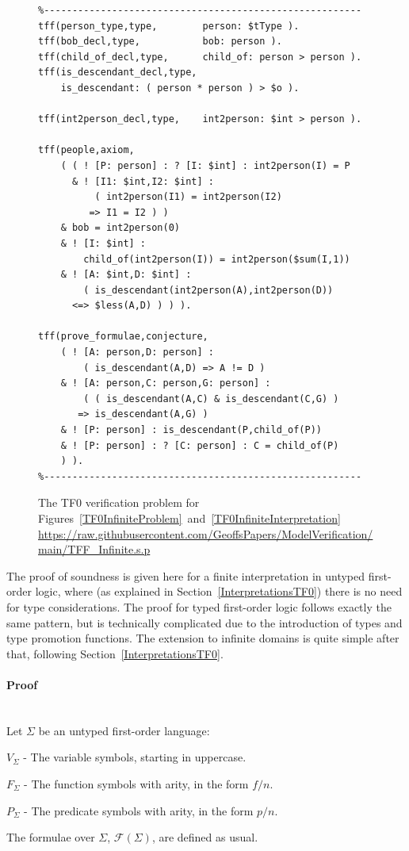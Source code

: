 \documentclass[letterpaper]{article}
\newenvironment{packed_itemize}{
\vspace*{-0.2em}
\begin{itemize}
\setlength{\partopsep}{0pt}
\setlength{\itemsep}{1pt}
\setlength{\parskip}{0pt}
\setlength{\parsep}{0pt}
}{\end{itemize}}
\begin{document}
\begin{figure}[htbp]
\scriptsize
{}
\begin{verbatim}
%--------------------------------------------------------
tff(person_type,type,        person: $tType ).
tff(bob_decl,type,           bob: person ).
tff(child_of_decl,type,      child_of: person > person ).
tff(is_descendant_decl,type, 
    is_descendant: ( person * person ) > $o ).

tff(int2person_decl,type,    int2person: $int > person ).

tff(people,axiom,
    ( ( ! [P: person] : ? [I: $int] : int2person(I) = P
      & ! [I1: $int,I2: $int] : 
          ( int2person(I1) = int2person(I2) 
         => I1 = I2 ) )
    & bob = int2person(0)
    & ! [I: $int] : 
        child_of(int2person(I)) = int2person($sum(I,1))
    & ! [A: $int,D: $int] : 
        ( is_descendant(int2person(A),int2person(D)) 
      <=> $less(A,D) ) ) ).

tff(prove_formulae,conjecture,
    ( ! [A: person,D: person] : 
        ( is_descendant(A,D) => A != D )
    & ! [A: person,C: person,G: person] :
        ( ( is_descendant(A,C) & is_descendant(C,G) )
       => is_descendant(A,G) )
    & ! [P: person] : is_descendant(P,child_of(P))
    & ! [P: person] : ? [C: person] : C = child_of(P) 
    ) ).
%--------------------------------------------------------
\end{verbatim}
\caption{The TF0 verification problem for 
Figures~\ref{TF0InfiniteProblem}~and~\ref{TF0InfiniteInterpretation}\\
{\scriptsize \url{https://raw.githubusercontent.com/GeoffsPapers/ModelVerification/main/TFF_Infinite.s.p}}}
\label{TF0InfiniteVerification}
\end{figure}

The proof of soundness is given here for a finite interpretation in untyped first-order logic, 
where (as explained in Section~\ref{InterpretationsTF0}) there is no need for type considerations.
The proof for typed first-order logic follows exactly the same pattern, but is technically
complicated due to the introduction of types and type promotion functions.
The extension to infinite domains is quite simple after that, following 
Section~\ref{InterpretationsTF0}.

\paragraph{Proof}
~\\
Let $\Sigma$ be an untyped first-order language:
\begin{packed_itemize}
\item $V_\Sigma$ - The variable symbols, starting in uppercase.
\item $F_\Sigma$ - The function symbols with arity, in the form $f/n$.
\item $P_\Sigma$ - The predicate symbols with arity, in the form $p/n$.
\end{packed_itemize}
The formulae over $\Sigma$, $\mathcal{F}(\Sigma)$, are defined as usual. 
\end{document}
